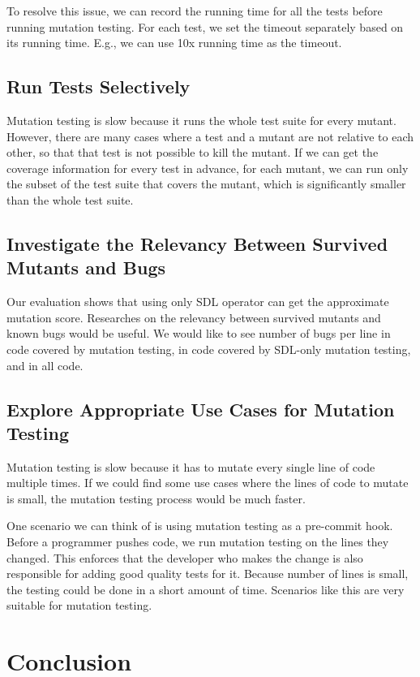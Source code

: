 \documentclass[12pt]{article}
\begin{document}
To resolve this issue, we can record the running time for all the tests before running mutation testing. For each test, we set the timeout separately based on its running time. E.g., we can use 10x running time as the timeout.

\subsection{Run Tests Selectively}

Mutation testing is slow because it runs the whole test suite for every mutant. However, there are many cases where a test and a mutant are not relative to each other, so that that test is not possible to kill the mutant. If we can get the coverage information for every test in advance, for each mutant, we can run only the subset of the test suite that covers the mutant, which is significantly smaller than the whole test suite.

\subsection{Investigate the Relevancy Between Survived Mutants and Bugs}

Our evaluation shows that using only SDL operator can get the approximate mutation score. Researches on the relevancy between survived mutants and known bugs would be useful. We would like to see number of bugs per line in code covered by mutation testing, in code covered by SDL-only mutation testing, and in all code.

\subsection{Explore Appropriate Use Cases for Mutation Testing}

Mutation testing is slow because it has to mutate every single line of code multiple times. If we could find some use cases where the lines of code to mutate is small, the mutation testing process would be much faster.

One scenario we can think of is using mutation testing as a pre-commit hook. Before a programmer pushes code, we run mutation testing on the lines they changed. This enforces that the developer who makes the change is also responsible for adding good quality tests for it. Because number of lines is small, the testing could be done in a short amount of time. Scenarios like this are very suitable for mutation testing.

\section{Conclusion}
\end{document}
